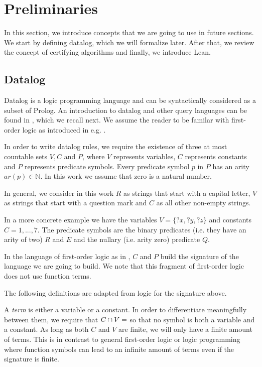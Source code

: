 \section{Preliminaries}\label{sec:prelim}


In this section, we introduce concepts that we are going to use in future sections. We start by defining datalog, which we will formalize later. After that, we review the concept of certifying algorithms and finally, we introduce Lean.


\subsection{Datalog}
Datalog is a logic programming language and can be syntactically considered as a subset of Prolog. An introduction to datalog and other query languages can be found in \cite{alice}, which we recall next. We assume the reader to be familar with first-order logic as introduced in e.g. \cite{logic}.

In order to write datalog rules, we require the existence of three at most countable sets $V, C$ and $P$, where $V$ represents variables, $C$ represents constants and $P$ represents predicate symbols. Every predicate symbol $p$ in $P$ has an arity $ar(p) \in \mathbb{N}$. In this work we assume that zero is a natural number.

\begin{example}
    In general, we consider in this work $R$ as strings that start with a capital letter, $V$ as strings that start with a question mark and $C$ as all other non-empty strings.
\end{example}

\begin{example}
In a more concrete example we have the variables $V= \{?x,?y,?z\}$ and constants $C= {1,...,7}$. The predicate symbols are the binary predicates (i.e. they have an arity of two) $R$ and $E$ and the nullary (i.e. arity zero) predicate $Q$.
\end{example}

In the language of first-order logic as in \cite{logic}, $C$ and $P$ build the signature of the language we are going to build. We note that this fragment of first-order logic does not use function terms.

The following definitions are adapted from logic for the signature above.

A \textit{term} is either a variable or a constant. In order to differentiate meaningfully between them, we require that $C \cap V = \empty$ so that no symbol is both a variable and a constant. As long as both $C$ and $V$ are finite, we will only have a finite amount of terms. This is in contrast to general first-order logic or logic programming where function symbols can lead to an infinite amount of terms even if the signature is finite.

